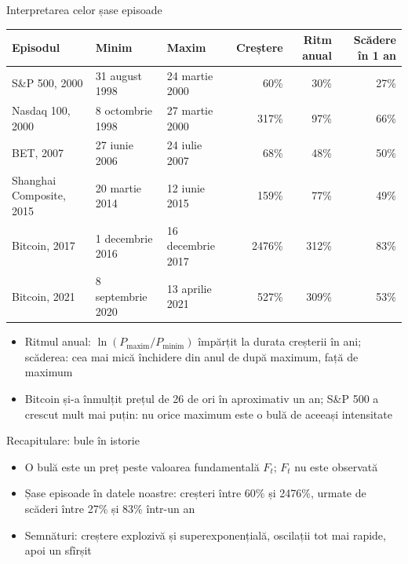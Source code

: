 \begin{frame}{Interpretarea celor șase episoade}
\itemsize{\footnotesize}
\setlength{\tabcolsep}{4pt}\begin{center}
\scriptsize
\begin{tabular}{lllrrr}
\toprule
\textbf{Episodul} & \textbf{Minim} & \textbf{Maxim} & \textbf{Creștere} & \textbf{Ritm anual} & \textbf{Scădere în 1 an} \\
\midrule
S\&P 500, 2000 & 31 august 1998 & 24 martie 2000 & 60\% & 30\% & 27\% \\
Nasdaq 100, 2000 & 8 octombrie 1998 & 27 martie 2000 & 317\% & 97\% & 66\% \\
BET, 2007 & 27 iunie 2006 & 24 iulie 2007 & 68\% & 48\% & 50\% \\
Shanghai Composite, 2015 & 20 martie 2014 & 12 iunie 2015 & 159\% & 77\% & 49\% \\
Bitcoin, 2017 & 1 decembrie 2016 & 16 decembrie 2017 & 2476\% & 312\% & 83\% \\
Bitcoin, 2021 & 8 septembrie 2020 & 13 aprilie 2021 & 527\% & 309\% & 53\% \\
\bottomrule
\end{tabular}
\end{center}
\begin{itemize}
    \item Ritmul anual: $\ln(P_{\text{maxim}}/P_{\text{minim}})$ împărțit la durata creșterii în ani; scăderea: cea mai mică închidere din anul de după maximum, față de maximum
    \item Bitcoin și-a înmulțit prețul de 26 de ori în aproximativ un an; S\&P 500 a crescut mult mai puțin: nu orice maximum este o bulă de aceeași intensitate
\end{itemize}
\end{frame}

\begin{frame}{Recapitulare: bule în istorie}
\itemsize{\small}
\begin{itemize}
    \item O bulă este un preț peste valoarea fundamentală $F_t$; $F_t$ nu este observată
    \item Șase episoade în datele noastre: creșteri între 60\% și 2476\%, urmate de scăderi între 27\% și 83\% într-un an
    \item Semnături: creștere explozivă și superexponențială, oscilații tot mai rapide, apoi un sfîrșit
\end{itemize}
\end{frame}


